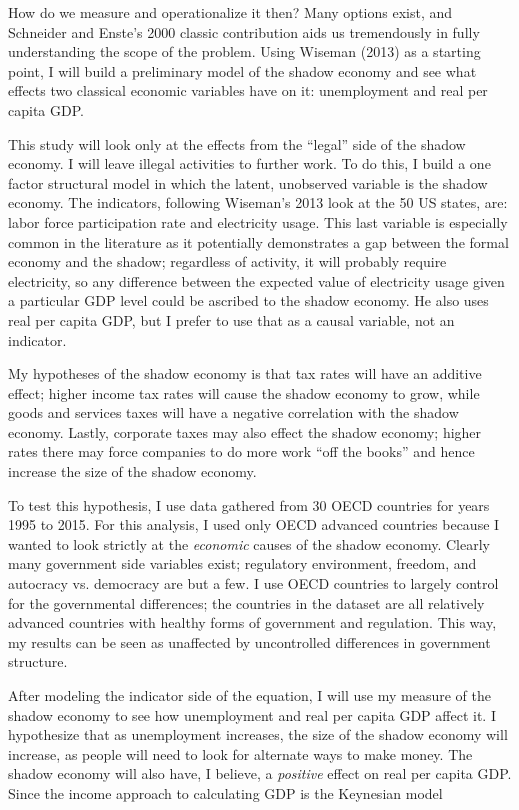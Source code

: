 \documentclass[12pt]{report}
\begin{document}
How do we measure and operationalize it then? Many options exist, and Schneider and Enste's 2000 classic contribution aids us tremendously in fully understanding the scope of the problem. Using Wiseman (2013) as a starting point, I will build a preliminary model of the shadow economy and see what effects two classical economic variables have on it: unemployment and real per capita GDP.

This study will look only at the effects from the ``legal'' side of the shadow economy. I will leave illegal activities to further work. To do this, I build a one factor structural model in which the latent, unobserved variable is the shadow economy. The indicators, following Wiseman's 2013 look at the 50 US states, are: labor force participation rate and electricity usage. This last variable is especially common in the literature as it potentially demonstrates a gap between the formal economy and the shadow; regardless of activity, it will probably require electricity, so any difference between the expected value of electricity usage given a particular GDP level could be ascribed to the shadow economy. He also uses real per capita GDP, but I prefer to use that as a causal variable, not an indicator. 

My hypotheses of the shadow economy is that tax rates will have an additive effect; higher income tax rates will cause the shadow economy to grow, while goods and services taxes will have a negative correlation with the shadow economy. Lastly, corporate taxes may also effect the shadow economy; higher rates there may force companies to do more work ``off the books'' and hence increase the size of the shadow economy. 

To test this hypothesis, I use data gathered from 30 OECD countries for years 1995 to 2015. For this analysis, I used only OECD advanced countries because I wanted to look strictly at the \textit{economic} causes of the shadow economy. Clearly many government side variables exist; regulatory environment, freedom, and autocracy vs. democracy are but a few. I use OECD countries to largely control for the governmental differences; the countries in the dataset are all relatively advanced countries with healthy forms of government and regulation. This way, my results can be seen as unaffected by uncontrolled differences in government structure. 

After modeling the indicator side of the equation, I will use my measure of the shadow economy to see how unemployment and real per capita GDP affect it. I hypothesize that as unemployment increases, the size of the shadow economy will increase, as people will need to look for alternate ways to make money. The shadow economy will also have, I believe, a \textit{positive} effect on real per capita GDP. Since the income approach to calculating GDP is the Keynesian model 
\end{document}
